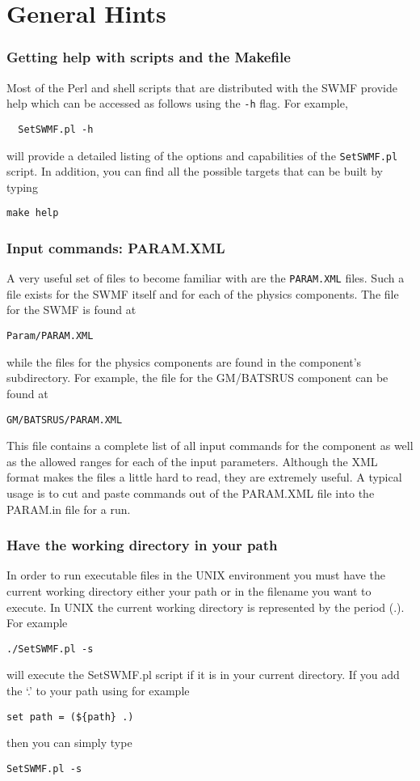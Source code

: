 \section{General Hints}

\subsubsection{Getting help with scripts and the Makefile}
Most of the Perl and shell scripts that are distributed with the SWMF
provide help which can be accessed as follows using the {\tt -h} flag.
For example, 
\begin{verbatim}
  SetSWMF.pl -h
\end{verbatim}
will provide a detailed listing of the options and capabilities of the
{\tt SetSWMF.pl} script.  In addition, you can find all the possible
targets  that can be built by typing
\begin{verbatim}
make help
\end{verbatim}

\subsubsection{Input commands: PARAM.XML}
A very useful set of files to become familiar with are the {\tt PARAM.XML}
files.  Such a file exists for the SWMF itself and for each of the
physics components.  The file for the SWMF is found at
\begin{verbatim}
Param/PARAM.XML
\end{verbatim}
while the files for the physics components are found in the component's
subdirectory.  For example, the file for the GM/BATSRUS component can
be found at
\begin{verbatim}
GM/BATSRUS/PARAM.XML
\end{verbatim}
This file contains a complete list of all input commands for the
component as well as the allowed ranges for each of the input parameters.
Although the XML format makes the files a little hard to read, they are
extremely useful.  A typical usage is to cut and paste commands out of the
PARAM.XML file into the PARAM.in file for a run.

\subsubsection{Have the working directory in your path}

In order to run executable files in the UNIX environment you must have
the current working directory either your path or in the filename you
want to execute. In UNIX the current working directory is represented
by the period (.).  For example
\begin{verbatim} 
./SetSWMF.pl -s
\end{verbatim}
will execute the SetSWMF.pl script if it is in your current directory.  
If you add the `.' to your path using for example
\begin{verbatim}
set path = (${path} .)
\end{verbatim}
then you can simply type
\begin{verbatim} 
SetSWMF.pl -s
\end{verbatim}

